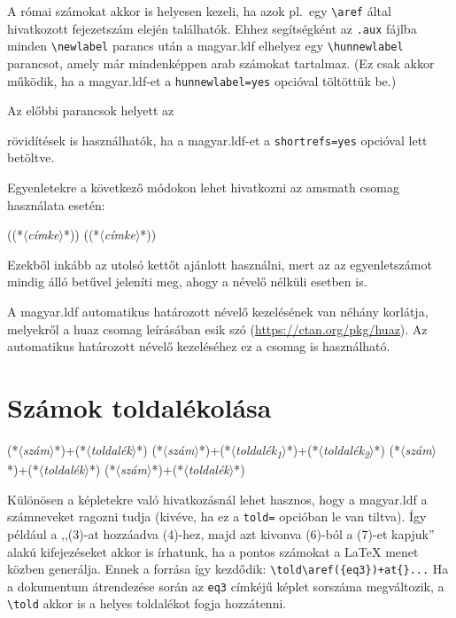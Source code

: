 \documentclass[12pt]{article}
\newcommand\param[1]{{\normalfont\slshape$\langle$#1$\rangle$}}
\begin{document}
A római számokat akkor is helyesen kezeli, ha azok pl.~egy \verb|\aref| által hivatkozott fejezetszám elején találhatók.
Ehhez segítségként az \texttt{.aux} fájlba minden \verb|\newlabel| parancs után a \textsf{magyar.ldf} elhelyez egy \verb|\hunnewlabel| parancsot, amely már mindenképpen arab számokat tartalmaz.
(Ez csak akkor működik, ha a magyar.ldf-et a \texttt{hunnewlabel=yes} opcióval töltöttük be.)

Az előbbi parancsok helyett az 
\begin{latexcode}
\azr \Azr \azp \Azp \azc \Azc 
\end{latexcode}
rövidítések is használhatók, ha a \textsf{magyar.ldf}-et a \texttt{shortrefs=yes} opcióval lett betöltve.

Egyenletekre a következő módokon lehet hivatkozni az \textsf{amsmath} csomag használata esetén:

\begin{latexcode}
\aref({(*\param{címke}*)})
\Aref({(*\param{címke}*)})
\az{\eqref{(*\param{címke}*)}}
\Az{\eqref{(*\param{címke}*)}}
\end{latexcode}
Ezekből inkább az utolsó kettőt ajánlott használni, mert az az egyenletszámot mindig álló betűvel jeleníti meg, ahogy a névelő nélküli esetben is.

A \textsf{magyar.ldf} automatikus határozott névelő kezelésének van néhány korlátja, melyekről a \textsf{huaz} csomag leírásában esik szó (\url{https://ctan.org/pkg/huaz}).
Az automatikus határozott névelő kezeléséhez ez a csomag is használható.

\section{Számok toldalékolása}\label{sec-toldalek}

\begin{latexcode}
\told(*\param{szám}*)+(*\param{toldalék}*){}
\told(*\param{szám}*)+(*\param{toldalék\textsubscript1}*)+(*\param{toldalék\textsubscript2}*){}
\atold(*\param{szám}*)+(*\param{toldalék}*){}
\Atold(*\param{szám}*)+(*\param{toldalék}*){}
\end{latexcode}
Különösen a képletekre való hivatkozásnál lehet hasznos, hogy a \textsf{magyar.ldf} a számneveket ragozni tudja (kivéve, ha ez a \texttt{told=} opcióban le van tiltva).
Így például a ,,(3)-at hozzáadva (4)-hez, majd azt kivonva (6)-ból a (7)-et kapjuk'' alakú kifejezéseket akkor is írhatunk, ha a pontos számokat a \LaTeX{} menet közben generálja.
Ennek a forrása így kezdődik: \verb|\told\aref({eq3})+at{}...|
Ha a dokumentum átrendezése során az \texttt{eq3} címkéjű képlet sorszáma megváltozik, a \verb|\told| akkor is a helyes toldalékot fogja hozzátenni.
\end{document}
